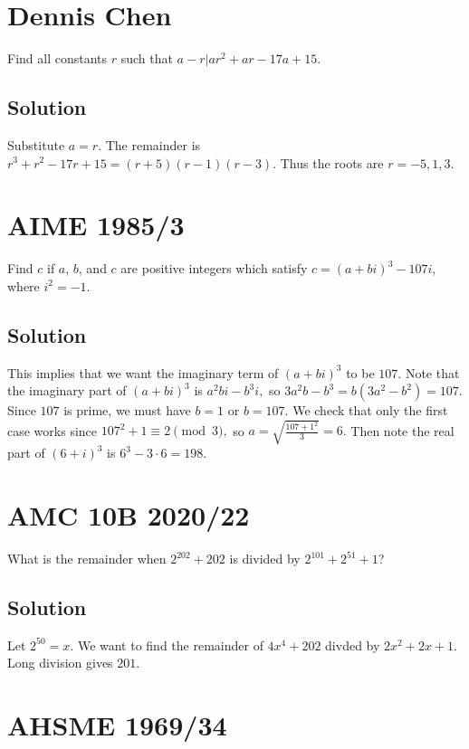 \documentclass[mast]{lucky}
\begin{document}
\pagebreak\section{Dennis Chen}

Find all constants $r$ such that $a-r|ar^2+ar-17a+15.$

\subsection{Solution}

Substitute $a=r.$ The remainder is $r^3+r^2-17r+15=(r+5)(r-1)(r-3).$ Thus the roots are $r=-5,1,3.$

\pagebreak\section{AIME 1985/3}

Find $c$ if $a$, $b$, and $c$ are positive integers which satisfy $c=(a + bi)^3 - 107i$, where $i^2 = -1$.

\subsection{Solution}

This implies that we want the imaginary term of $(a+bi)^3$ to be $107.$ Note that the imaginary part of $(a+bi)^3$ is $a^2bi-b^3i,$ so $3a^2b-b^3=b(3a^2-b^2)=107.$ Since $107$ is prime, we must have $b=1$ or $b=107.$ We check that only the first case works since $107^2+1\equiv 2\pmod{3},$ so $a=\sqrt{\frac{107+1^2}{3}}=6.$ Then note the real part of $(6+i)^3$ is $6^3-3\cdot 6=198.$

\pagebreak\section{AMC 10B 2020/22}

What is the remainder when $2^{202}+202$ is divided by $2^{101}+2^{51}+1$?

\subsection{Solution}

Let $2^{50}=x.$ We want to find the remainder of $4x^4+202$ divded by $2x^2+2x+1.$ Long division gives $201.$

\pagebreak\section{AHSME 1969/34}
\end{document}
